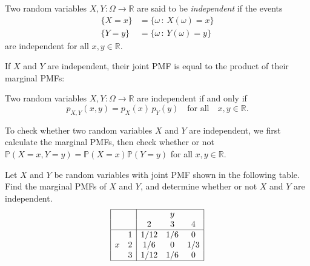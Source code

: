 \documentclass[lecture]{csm}
\newcommand{\R}{\mathbb{R}}
\newcommand{\prob}{\mathbb{P}}
\begin{document}

\begin{definition}
Two random variables $X,Y:\Omega\to\R$ are said to be \emph{independent} if the events 
\begin{align*}
\{X = x\} & = \{\omega\,:\, X(\omega) = x\} \\
\{Y = y\} & = \{\omega\,:\, Y(\omega) = y\}
\end{align*}
are independent for all $x,y\in\R$.
\end{definition}

\newpage
If $X$ and $Y$ are independent, their joint PMF is equal to the product of their marginal PMFs:
\begin{lemma}
Two random variables $X,Y:\Omega\to\R$ are independent if and only if
\[
p_{X,Y}(x,y) = p_X(x)\,p_Y(y) \quad\text{for all}\quad x,y\in\R.
\]
\end{lemma}

\begin{remark}
To check whether two random variables $X$ and $Y$ are independent, we first calculate the marginal PMFs, then check whether or not 
$\prob(X=x,Y=y) = \prob(X=x)\prob(Y=y)$ for all $x,y\in\R$.
\end{remark}

\newpage

\begin{example}\label{ex:tedious}
Let $X$ and $Y$ be random variables with joint PMF shown in the following table. 
Find the marginal PMFs of $X$ and $Y$, and determine whether or not $X$ and $Y$ are independent.
\[\begin{array}{|cc|ccc|}\hline
	&	& 		& y 		&			\\ 
	&	& 2		& 3		& 4		\\\hline
	& 1	& 1/12	& 1/6	& 0 		\\
x	& 2	& 1/6	& 0		& 1/3 	\\
	& 3	& 1/12	& 1/6  	& 0		\\ \hline
\end{array}\]
\end{example}
\end{document}
